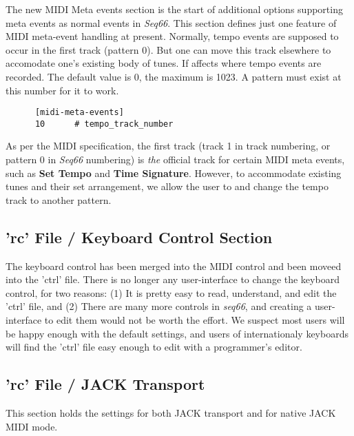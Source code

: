    The new MIDI Meta events section is the start of additional options
   supporting meta events as normal events in \textsl{Seq66}.
   This section defines just one feature of MIDI meta-event handling at present.
   Normally, tempo events are supposed to occur in the first track (pattern 0).
   But one can move this track elsewhere to accomodate one's existing body of
   tunes.  If affects where tempo events are recorded.  The default value is 0,
   the maximum is 1023.  A pattern must exist at this number for it to work.

   \begin{verbatim}
      [midi-meta-events]
      10      # tempo_track_number
   \end{verbatim}

   As per the MIDI specification, the first track (track 1 in track
   numbering, or pattern 0 in \textsl{Seq66} numbering) is \textsl{the}
   official track for certain MIDI meta events, such as
   \textbf{Set Tempo} and
   \textbf{Time Signature}.
   However, to accommodate existing tunes and their set
   arrangement, we allow the user to
   and change the tempo track to another pattern.

\subsection{'rc' File / Keyboard Control Section}
\label{subsec:configuration_keyboard_control}

   The keyboard control has been merged into the MIDI control and been moveed
   into the 'ctrl' file.
   There is no longer any user-interface to change the
   keyboard control, for two reasons:
   (1) It is pretty easy to read, understand, and edit the 'ctrl' file, and
   (2) There are many more controls in \textsl{seq66}, and creating a
   user-interface to edit them would not be worth the effort.
   We suspect most users will be happy enough with the default settings,
   and users of internationaly keyboards will find the 'ctrl' file easy enough
   to edit with a programmer's editor.
        
\subsection{'rc' File / JACK Transport}
\label{subsec:configuration_jack_transport}

   This section holds the settings for both JACK transport and for native JACK
   MIDI mode.

